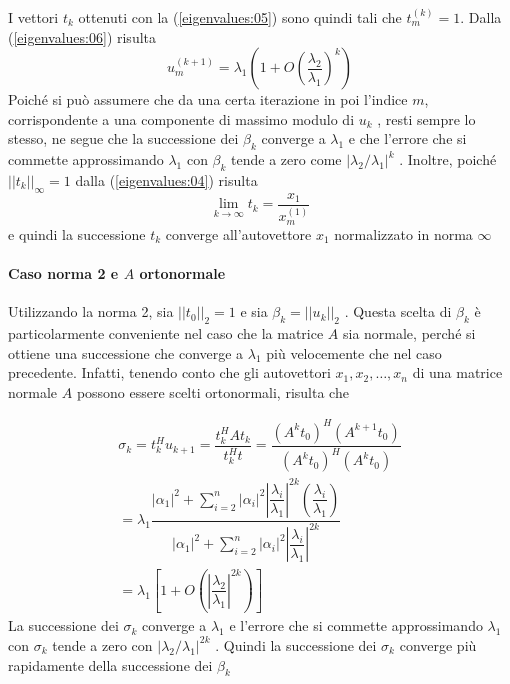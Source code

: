 I vettori $t_k$ ottenuti con la (\ref{eigenvalues:05})
sono quindi tali che $t_m^{(k)} = 1$. Dalla (\ref{eigenvalues:06})
risulta
$$ u_m^{(k+1)} = \lambda_1 \left(  1 + O\left( \frac{\lambda_2}{\lambda_1} \right)^{k} \right) $$
Poich\'e  si pu\`o assumere che da una certa iterazione in poi l'indice $m$,
corrispondente a una componente di massimo modulo di $u_k$ , resti sempre lo
stesso, ne segue che la successione dei $\beta_k$ converge a $\lambda_1$ e che
 l'errore che si commette approssimando $\lambda_1$ con $\beta_k$ tende a zero
come $|\lambda_2 / \lambda_1 |^k$ . Inoltre,
poich\'e $||t_k||_{\infty} = 1$ dalla   (\ref{eigenvalues:04}) risulta
$$
\lim_{k \to \infty} t_k = \dfrac{x_1}{x_m^{(1)}}
$$
e quindi la successione $t_k$ converge all'autovettore $x_1$ normalizzato in
norma $\infty$



\paragraph{Caso norma 2 e $A$ ortonormale}
Utilizzando la norma 2, sia $||t_0||_2 = 1$ e sia $\beta_k = ||u_k||_2$ .
 Questa scelta di $\beta_k$ \`e particolarmente conveniente nel caso che la
 matrice $A$ sia normale, perch\'e si ottiene una successione che converge
 a $\lambda_1$ pi\`u velocemente che nel
caso precedente. Infatti, tenendo conto che gli autovettori
$x_1 , x_2 , \ldots , x_n$ di una matrice normale $A$ possono essere scelti
ortonormali, risulta che

$$
\begin{array}{l}
\sigma_k = t_k^{H}u_{k+1} = \dfrac{t_k^{H}At_k}{t_k^{H}t} =
\dfrac{(A^{k} t_0)^{H} (A^{k+1}t_0)}{(A^{k}t_0)^{H} (A^{k}t_0)}  \\
= \lambda_1 \dfrac{|\alpha_1|^{2} + \displaystyle
 \sum_{i=2}^{n} |\alpha_i|^{2}
 \left|\dfrac{\lambda_i}{\lambda_1} \right|^{2k} \left(\dfrac{\lambda_i}{\lambda_1} \right) }
{|\alpha_1|^{2} + \displaystyle \sum_{i=2}^{n} |\alpha_i|^{2}
 \left|\dfrac{\lambda_i}{\lambda_1} \right|^{2k} } \\
= \lambda_1 \left[ 1 + O\left(\left|\dfrac{\lambda_2}{\lambda_1}\right|^{2k} \right) \right]
\end{array}
$$
La successione dei $\sigma_k$ converge a $\lambda_1$ e l'errore che si commette
approssimando $\lambda_1$ con $\sigma_k$ tende a zero con
$|\lambda_2 /\lambda_1 |^{2k}$ . Quindi la successione dei $\sigma_k$ converge
pi\`u rapidamente della successione dei $\beta_k$


